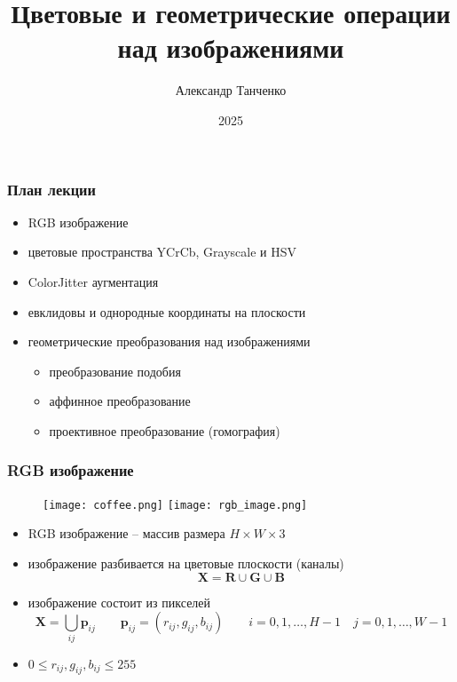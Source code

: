 \documentclass[
    12pt, 
    usepdftitle=false,
    aspectratio=1610
]{beamer}
\title[Лекция 1]{
    Цветовые и геометрические операции над изображениями
}
\author{Александр Танченко}
\institute{}
\date{2025}
\begin{document}
\begin{frame}
    \titlepage
\end{frame}


\begin{frame}
\frametitle{План лекции}
\begin{itemize}
    \item RGB изображение
    \item цветовые пространства YCrCb, Grayscale и HSV
    \item ColorJitter аугментация 
    \item евклидовы и однородные координаты на плоскости 
    \item геометрические преобразования над изображениями
    \begin{itemize}
        \item преобразование подобия
        \item аффинное преобразование
        \item проективное преобразование (гомография)
    \end{itemize}
\end{itemize}
\end{frame}


\begin{frame}
\frametitle{RGB изображение}
\begin{figure}
    \centering
    \texttt{[image: coffee.png]}
    \texttt{[image: rgb\_image.png]}
\end{figure}
\begin{itemize}
    \item RGB изображение -- массив размера $H\times W\times 3$
    \item изображение разбивается на цветовые плоскости (каналы)
    $$
        \mathbf{X}=\mathbf{R}\cup\mathbf{G}\cup\mathbf{B}
    $$
    \item изображение состоит из пикселей
    $$
        \mathbf{X}=\bigcup\limits_{ij}\mathbf{p}_{ij}
        \qquad
        \mathbf{p}_{ij}=\left(r_{ij}, g_{ij}, b_{ij}\right)
        \qquad
        i=0,1,\ldots,H-1
        \quad
        j=0,1,\ldots,W-1
    $$
    \item $0\leqslant r_{ij}, g_{ij}, b_{ij} \leqslant 255$
\end{itemize}
\end{frame}
\end{document}
